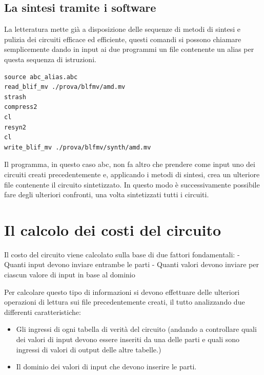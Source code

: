 \documentclass[
]{book}
\providecommand{\tightlist}{%
  \setlength{\itemsep}{0pt}\setlength{\parskip}{0pt}}
\begin{document}
\hypertarget{la-sintesi-tramite-i-software}{%
\subsection{La sintesi tramite i software}\label{la-sintesi-tramite-i-software}}

La letteratura mette già a disposizione delle sequenze di metodi di sintesi e pulizia dei circuiti efficace ed efficiente, questi comandi si possono chiamare semplicemente dando in input ai due programmi un file contenente un alias per questa sequenza di istruzioni.

\begin{verbatim}
source abc_alias.abc
read_blif_mv ./prova/blfmv/amd.mv
strash
compress2
cl
resyn2
cl
write_blif_mv ./prova/blfmv/synth/amd.mv
\end{verbatim}

Il programma, in questo caso abc, non fa altro che prendere come input uno dei circuiti creati precedentemente e, applicando i metodi di sintesi, crea un ulteriore file contenente il circuito sintetizzato. In questo modo è successivamente possibile fare degli ulteriori confronti, una volta sintetizzati tutti i circuiti.

\hypertarget{il-calcolo-dei-costi-del-circuito}{%
\section{Il calcolo dei costi del circuito}\label{il-calcolo-dei-costi-del-circuito}}

Il costo del circuito viene calcolato sulla base di due fattori fondamentali:
- Quanti input devono inviare entrambe le parti
- Quanti valori devono inviare per ciascun valore di input in base al dominio

Per calcolare questo tipo di informazioni si devono effettuare delle ulteriori operazioni di lettura sui file precedentemente creati, il tutto analizzando due differenti caratteristiche:

\begin{itemize}
\tightlist
\item
  Gli ingressi di ogni tabella di verità del circuito (andando a controllare quali dei valori di input devono essere inseriti da una delle parti e quali sono ingressi di valori di output delle altre tabelle.)
\item
  Il dominio dei valori di input che devono inserire le parti.
\end{itemize}
\end{document}
